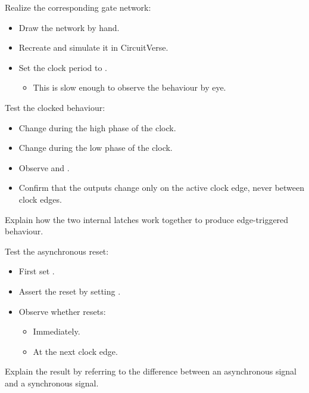 \begin{parts}
  \item Realize the corresponding gate network:
    \begin{itemize}
      \item Draw the network by hand.
      \item Recreate and simulate it in CircuitVerse.
      \item Set the clock period to .
        \begin{itemize}
          \item This is slow enough to observe the behaviour by eye.
        \end{itemize}
    \end{itemize}
  \item Test the clocked behaviour:
    \begin{itemize}
      \item Change  during the high phase of the clock.
      \item Change  during the low phase of the clock.
      \item Observe  and .
      \item Confirm that the outputs change only on the active clock edge, never between clock
        edges.
    \end{itemize}
    Explain how the two internal latches work together to produce edge-triggered behaviour.
  \item Test the asynchronous reset:
    \begin{itemize}
      \item First set .
      \item Assert the reset by setting .
      \item Observe whether  resets:
        \begin{itemize}
          \item Immediately.
          \item At the next clock edge.
        \end{itemize}
    \end{itemize}
    Explain the result by referring to the difference between an asynchronous signal and a
    synchronous signal.
\end{parts}

\label{c3:set:3}

